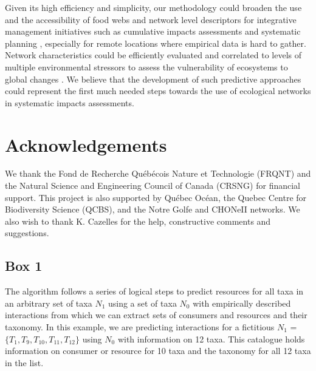 \documentclass[letterpaper]{article}
\begin{document}
Given its high efficiency and simplicity, our methodology could broaden the use and the accessibility of food webs and network level descriptors for integrative management initiatives such as cumulative impacts assessments and systematic planning \citep{Giakoumi2015, Beauchesne2016}, especially for remote locations where empirical data is hard to gather. Network characteristics could be efficiently evaluated and correlated to levels of multiple environmental stressors to assess the vulnerability of ecosystems to global changes \citep{Albouy2014}. We believe that the development of such predictive approaches could represent the first much needed steps towards the use of ecological networks in systematic impacts assessments.

\section{Acknowledgements}
We thank the Fond de Recherche Québécois Nature et Technologie (FRQNT) and the Natural Science and Engineering Council of Canada (CRSNG) for financial support. This project is also supported by Québec Océan, the Quebec Centre for Biodiversity Science (QCBS), and the Notre Golfe and CHONeII networks. We also wish to thank K. Cazelles for the help, constructive comments and suggestions.

\printbibliography


\newpage
\subsection{Box 1}
The algorithm follows a series of logical steps to predict resources for all taxa in an arbitrary set of taxa $N_1$ using a set of taxa $N_0$ with empirically described interactions from which we can extract sets of consumers and resources and their taxonomy. In this example, we are predicting interactions for a fictitious $N_1$
 = $\{T_1, T_9, T_{10},T_{11}, T_{12}\}$ using $N_0$ with information on 12 taxa. This catalogue holds information on consumer or resource for 10 taxa and the taxonomy for all 12 taxa in the list.
\end{document}
